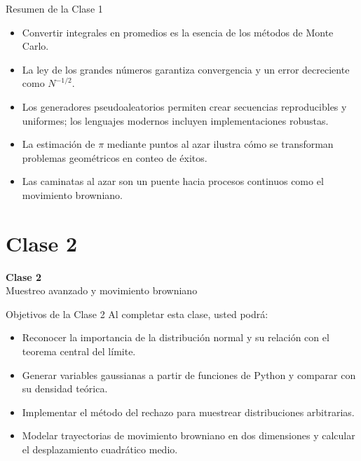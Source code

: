\begin{frame}{Resumen de la Clase 1}
\begin{itemize}
    \item Convertir integrales en promedios es la esencia de los métodos de Monte Carlo.
    \item La ley de los grandes números garantiza convergencia y un error decreciente como $N^{-1/2}$.
    \item Los generadores pseudoaleatorios permiten crear secuencias reproducibles y uniformes; los lenguajes modernos incluyen implementaciones robustas.
    \item La estimación de $\pi$ mediante puntos al azar ilustra cómo se transforman problemas geométricos en conteo de éxitos.
    \item Las caminatas al azar son un puente hacia procesos continuos como el movimiento browniano.
\end{itemize}
\end{frame}

\section{Clase 2}

\begin{frame}[plain]
\centering
\vfill
{\Huge \bfseries Clase 2}\\[0.4cm]
{\Large Muestreo avanzado y movimiento browniano}
\vfill
\end{frame}

\begin{frame}{Objetivos de la Clase 2}
Al completar esta clase, usted podrá:
\begin{itemize}
    \item Reconocer la importancia de la distribución normal y su relación con el teorema central del límite.
    \item Generar variables gaussianas a partir de funciones de Python y comparar con su densidad teórica.
    \item Implementar el método del rechazo para muestrear distribuciones arbitrarias.
    \item Modelar trayectorias de movimiento browniano en dos dimensiones y calcular el desplazamiento cuadrático medio.
\end{itemize}
\end{frame}

